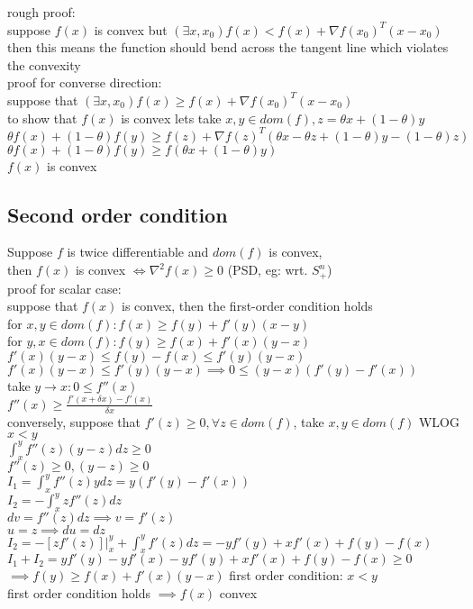 \documentclass[8pt]{extarticle}
\begin{document}
\begin{multicols*}{2}
  rough proof:\\
  suppose $f(x)$ is convex but $(\exists x, x_0) f(x) < f(x) + \nabla f(x_0)^T(x-x_0)$\\
  then this means the function should bend across the tangent line which violates the convexity\\
  
  proof for converse direction:\\
  suppose that $(\exists x, x_0) f(x) \geq f(x) + \nabla f(x_0)^T(x-x_0)$\\
  to show that $f(x)$ is convex lets take $x,y \in dom(f), z= \theta x + (1-\theta)y$\\
  $\theta f(x) + (1-\theta) f(y) \geq f(z) + \nabla f(z)^T(\theta x - \theta z + (1-\theta)y - (1-\theta)z)$\\
  $\theta f(x) + (1-\theta) f(y) \geq f(\theta x +(1-\theta)y)$\\
  $f(x)$ is convex
  \subsection{Second order condition}
  Suppose $f$ is twice differentiable and $dom(f)$ is convex, \\
  then $f(x)$ is convex $\iff \nabla^2 f(x) \geq 0 $ (PSD, eg: wrt. $S_+^n$)\\
  
  proof for scalar case:\\
  suppose that $f(x)$ is convex, then the first-order condition holds\\
  for $x,y \in dom(f): f(x) \geq f(y) + f'(y)(x-y)$\\
  for $y,x \in dom(f): f(y) \geq f(x) + f'(x)(y-x)$\\
  $f'(x)(y-x) \leq f(y)-f(x) \leq f'(y)(y-x)$\\
  $f'(x)(y-x) \leq f'(y)(y-x) \implies 0 \leq (y-x)(f'(y)-f'(x))$\\
  take $y\to x: 0 \leq f''(x)$\\
  $f''(x) \geq \frac{f'(x+\delta x)-f'(x)}{\delta x}$\\

  conversely, suppose that $f'(z) \geq 0, \forall z \in dom(f)$, take $x,y \in dom(f)$ WLOG $x < y$\\
  $\int_x^y f''(z)(y-z) dz \geq 0$\\
  $f''(z) \geq 0, (y-z) \geq 0$\\
  $I_1 = \int_x^y f''(z)y dz =  y(f'(y)-f'(x))$\\
  $I_2 = -\int_x^y zf''(z) dz$\\
  $dv=f''(z) dz \implies v = f'(z)$\\
  $u=z\implies du = dz$\\
  $I_2 = -[z f'(z)]|_x^y + \int_x^y f'(z) dz = -y f'(y) + x f'(x)+f(y)-f(x)$\\
  $I_1+I_2=y f'(y)-y f'(x)-y f'(y) + x f'(x) + f(y)-f(x) \geq 0$\\
  $\implies f(y) \geq f(x) + f'(x)(y-x)$ first order condition: $x<y$\\
  first order condition holds $\implies f(x)$ convex\\


\end{multicols*}
\end{document}
